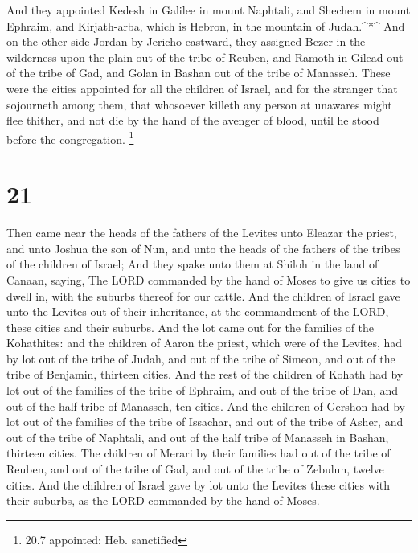  And they appointed Kedesh in Galilee in mount Naphtali, and
Shechem in mount Ephraim, and Kirjath-arba, which is Hebron, in the
mountain of Judah.\^{}*\^{}  And on the other side Jordan by
Jericho eastward, they assigned Bezer in the wilderness upon the plain
out of the tribe of Reuben, and Ramoth in Gilead out of the tribe of
Gad, and Golan in Bashan out of the tribe of Manasseh. 
These were the cities appointed for all the children of Israel, and for
the stranger that sojourneth among them, that whosoever killeth any
person at unawares might flee thither, and not die by the hand of the
avenger of blood, until he stood before the congregation. \footnote{20.7
  appointed: Heb. sanctified}

\hypertarget{section-20}{%
\section{21}\label{section-20}}

 Then came near the heads of the fathers of the Levites unto
Eleazar the priest, and unto Joshua the son of Nun, and unto the heads
of the fathers of the tribes of the children of Israel;  And
they spake unto them at Shiloh in the land of Canaan, saying, The LORD
commanded by the hand of Moses to give us cities to dwell in, with the
suburbs thereof for our cattle.  And the children of Israel
gave unto the Levites out of their inheritance, at the commandment of
the LORD, these cities and their suburbs.  And the lot came
out for the families of the Kohathites: and the children of Aaron the
priest, which were of the Levites, had by lot out of the tribe of Judah,
and out of the tribe of Simeon, and out of the tribe of Benjamin,
thirteen cities.  And the rest of the children of Kohath had
by lot out of the families of the tribe of Ephraim, and out of the tribe
of Dan, and out of the half tribe of Manasseh, ten cities. 
And the children of Gershon had by lot out of the families of the tribe
of Issachar, and out of the tribe of Asher, and out of the tribe of
Naphtali, and out of the half tribe of Manasseh in Bashan, thirteen
cities.  The children of Merari by their families had out of
the tribe of Reuben, and out of the tribe of Gad, and out of the tribe
of Zebulun, twelve cities.  And the children of Israel gave
by lot unto the Levites these cities with their suburbs, as the LORD
commanded by the hand of Moses.

